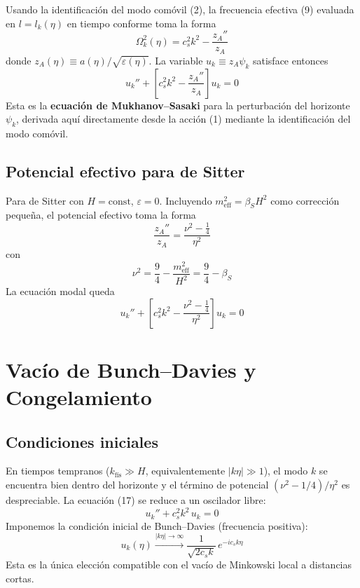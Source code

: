 \documentclass[12pt,a4paper]{article}
\begin{document}
Usando la identificación del modo comóvil (2), la frecuencia efectiva (9) evaluada en $l = l_k(\eta)$ en tiempo conforme toma la forma
\begin{equation}
\Omega_k^2(\eta) = c_s^2 k^2 - \frac{z_A''}{z_A} \tag{13}
\end{equation}
donde $z_A(\eta) \equiv a(\eta)/\sqrt{\varepsilon(\eta)}$. La variable $u_k \equiv z_A \psi_k$ satisface entonces
\begin{equation}
u_k'' + \left[c_s^2 k^2 - \frac{z_A''}{z_A}\right]u_k = 0 \tag{14}
\end{equation}
Esta es la \textbf{ecuación de Mukhanov--Sasaki} para la perturbación del horizonte $\psi_k$, derivada aquí directamente desde la acción (1) mediante la identificación del modo comóvil.

\subsection{Potencial efectivo para de Sitter}

Para de Sitter con $H = \text{const}$, $\varepsilon = 0$. Incluyendo $m_\text{eff}^2 = \beta_S H^2$ como corrección pequeña, el potencial efectivo toma la forma
\begin{equation}
\frac{z_A''}{z_A} = \frac{\nu^2 - \frac{1}{4}}{\eta^2} \tag{15}
\end{equation}
con
\begin{equation}
\nu^2 = \frac{9}{4} - \frac{m_\text{eff}^2}{H^2} = \frac{9}{4} - \beta_S \tag{16}
\end{equation}
La ecuación modal queda
\begin{equation}
u_k'' + \left[c_s^2 k^2 - \frac{\nu^2 - \frac{1}{4}}{\eta^2}\right]u_k = 0 \tag{17}
\end{equation}

\section{Vacío de Bunch--Davies y Congelamiento}

\subsection{Condiciones iniciales}

En tiempos tempranos ($k_\text{fís} \gg H$, equivalentemente $|k\eta| \gg 1$), el modo $k$ se encuentra bien dentro del horizonte y el término de potencial $(\nu^2 - 1/4)/\eta^2$ es despreciable. La ecuación (17) se reduce a un oscilador libre:
\begin{equation}
u_k'' + c_s^2 k^2\, u_k = 0 \tag{18}
\end{equation}
Imponemos la condición inicial de Bunch--Davies (frecuencia positiva):
\begin{equation}
u_k(\eta) \xrightarrow{|k\eta| \to \infty} \frac{1}{\sqrt{2c_s k}}\,e^{-ic_s k\eta} \tag{19}
\end{equation}
Esta es la única elección compatible con el vacío de Minkowski local a distancias cortas.
\end{document}
